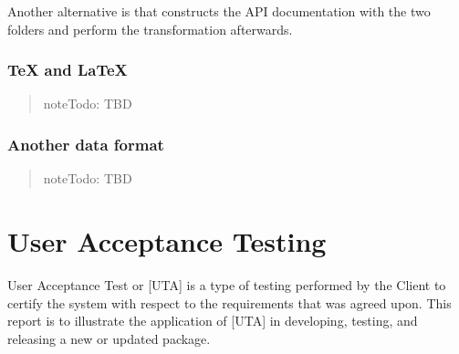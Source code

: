 \documentclass[a4paper,12pt,english]{sphinxhowto}
\begin{document}
Another alternative is  that constructs the API documentation with the two folders and perform
the transformation afterwards.
\begin{quote}

\begin{sphinxVerbatim}[commandchars=\\\{\},formatcom=\footnotesize]
  \PYG{p}{[}\PYG{p}{]}   
  \PYG{p}{[}\PYG{p}{]}   
\end{sphinxVerbatim}
\end{quote}



\subsubsection{TeX and LaTeX}
\label{\detokenize{DDHH:tex-and-latex}}\begin{quote}

\begin{sphinxadmonition}{note}{\label{\detokenize{DDHH:id2}}Todo:}
TBD
\end{sphinxadmonition}
\end{quote}



\subsubsection{Another data format}
\label{\detokenize{DDHH:another-data-format}}\begin{quote}

\begin{sphinxadmonition}{note}{\label{\detokenize{DDHH:id3}}Todo:}
TBD
\end{sphinxadmonition}
\end{quote}



\section{User Acceptance Testing}
\label{\detokenize{UAT:user-acceptance-testing}}\label{\detokenize{UAT::doc}}
User Acceptance Test or {[}UTA{]} is a type of testing performed by the Client to certify
the system with respect to the requirements that was agreed upon. This report is to
illustrate the application of {[}UTA{]} in developing, testing, and releasing a new or updated
 package.
\end{document}
